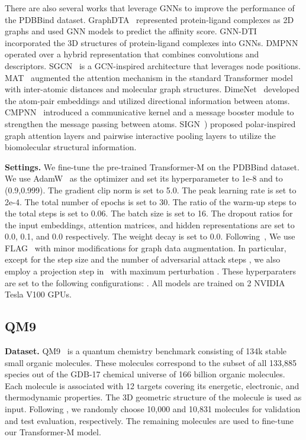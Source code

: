 \documentclass{article} \usepackage[dvipsnames]{xcolor}
\begin{document}
There are also several works that leverage GNNs to improve the performance of the PDBBind dataset. GraphDTA~\citep{2020GraphDTA} represented protein-ligand complexes as 2D graphs and used GNN models to predict the affinity score. GNN-DTI~\citep{2019Predicting} incorporated the 3D structures of protein-ligand complexes into GNNs. DMPNN~\citep{2019Analyzing} operated over a hybrid representation that combines convolutions and descriptors. SGCN~\citep{danel2020spatial} is a GCN-inspired architecture that leverages node positions. MAT~\citep{maziarka2020molecule} augmented the attention mechanism in the standard Transformer model with inter-atomic distances and molecular graph structures. DimeNet~\citep{klicpera2020directional} developed the atom-pair embeddings and utilized directional information between atoms. CMPNN~\citep{2020Communicative} introduced a communicative kernel and a message booster module to strengthen the message passing between atoms. SIGN~\citep{li2021structure}) proposed polar-inspired graph attention
layers and pairwise interactive pooling layers to utilize the biomolecular structural information. 

\textbf{Settings.} We fine-tune the pre-trained Transformer-M on the PDBBind dataset. We use AdamW~\citep{kingma2014adam} as the optimizer and set its hyperparameter  to 1e-8 and  to (0.9,0.999). The gradient clip norm is set to 5.0. The peak learning rate is set to 2e-4. The total number of epochs is set to 30. The ratio of the warm-up steps to the total steps is set to 0.06. The batch size is set to 16. The dropout ratios for the input embeddings, attention matrices, and hidden representations are set to 0.0, 0.1, and 0.0 respectively. The weight decay is set to 0.0. Following~\citep{ying2021transformers}, We use FLAG~\citep{kong2020flag} with minor modifications for graph data augmentation. In particular, except for the step size  and the number of adversarial attack steps , we also employ a projection step in~\citet{zhu2020freelb} with maximum perturbation . These hyperparaters are set to the following configurations: . All models are trained on 2 NVIDIA Tesla V100 GPUs.

\vspace{-5pt}
\subsection{QM9}
\label{app:qm9}
\textbf{Dataset. }
QM9~\citep{ramakrishnan2014quantum} is a quantum chemistry benchmark consisting of 134k stable small organic molecules. These molecules correspond to the subset of all 133,885 species out of the GDB-17 chemical universe of 166 billion organic molecules. Each molecule is associated with 12 targets covering its energetic, electronic, and thermodynamic properties. The 3D geometric structure of the molecule is used as input. Following \citet{tholke2021equivariant}, we randomly choose 10,000 and 10,831 molecules for validation and test evaluation, respectively. The remaining molecules are used to fine-tune our Transformer-M model.
\end{document}
